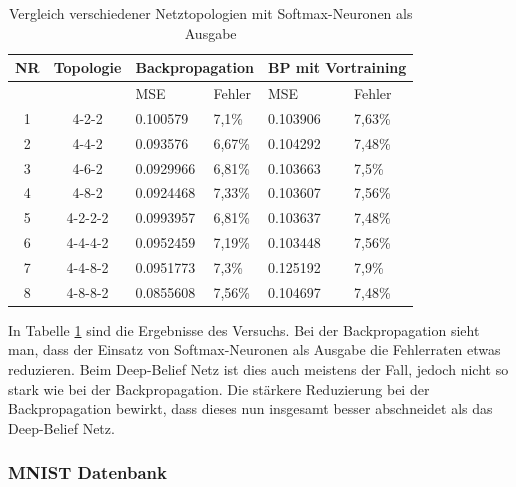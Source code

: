 \documentclass[12pt]{article}
\begin{document}
\begin{table}[H]
\begin{tabularx}{\textwidth}{|c|c|X|X|X|X|}
	\hline
	NR & Topologie & \multicolumn{2}{|c|}{Backpropagation} & \multicolumn{2}{|c|}{BP mit Vortraining}  \\\hline
	&&MSE& Fehler&MSE& Fehler
	\\\hline
	1&4-2-2&0.100579&7,1\%&0.103906&7,63\%\\\hline
	2&4-4-2&0.093576&6,67\%&0.104292&7,48\%\\\hline
	3&4-6-2&0.0929966&6,81\%&0.103663&7,5\%\\\hline
	4&4-8-2&0.0924468&7,33\%&0.103607&7,56\%\\\hline
	5&4-2-2-2&0.0993957&6,81\%&0.103637&7,48\%\\\hline
	6&4-4-4-2&0.0952459&7,19\%&0.103448&7,56\%\\\hline
	7&4-4-8-2&0.0951773&7,3\%&0.125192&7,9\%\\\hline
	8&4-8-8-2&0.0855608&7,56\%&0.104697&7,48\%\\\hline
	\end{tabularx}
	\caption{Vergleich verschiedener Netztopologien mit Softmax-Neuronen als Ausgabe}
	\label{softmax}
	\end{table}
	In Tabelle \ref{softmax} sind die Ergebnisse des Versuchs. Bei der Backpropagation sieht man, dass der Einsatz von Softmax-Neuronen als Ausgabe die Fehlerraten etwas reduzieren. Beim Deep-Belief Netz ist dies auch meistens der Fall, jedoch nicht so stark wie bei der Backpropagation. Die stärkere Reduzierung bei der Backpropagation bewirkt, dass dieses nun insgesamt besser abschneidet als das Deep-Belief Netz.
	\newpage
	\subsubsection{MNIST Datenbank}
	
\end{document}
